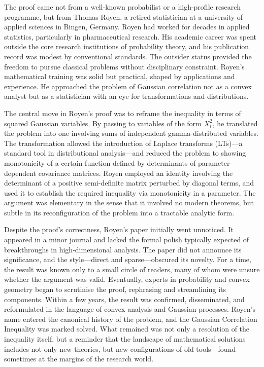 The proof came not from a well-known probabilist or a high-profile research programme, but from Thomas Royen, a retired statistician at a university of applied sciences in Bingen, Germany. Royen had worked for decades in applied statistics, particularly in pharmaceutical research. His academic career was spent outside the core research institutions of probability theory, and his publication record was modest by conventional standards. The outsider status provided the freedom to pursue classical problems without disciplinary constraint. Royen's mathematical training was solid but practical, shaped by applications and experience. He approached the problem of Gaussian correlation not as a convex analyst but as a statistician with an eye for transformations and distributions.

The central move in Royen's proof was to reframe the inequality in terms of squared Gaussian variables. By passing to variables of the form \( X_i^2 \), he translated the problem into one involving sums of independent gamma-distributed variables. The transformation allowed the introduction of Laplace transforms (LTs)—a standard tool in distributional analysis—and reduced the problem to showing monotonicity of a certain function defined by determinants of parameter-dependent covariance matrices. Royen employed an identity involving the determinant of a positive semi-definite matrix perturbed by diagonal terms, and used it to establish the required inequality via monotonicity in a parameter. The argument was elementary in the sense that it involved no modern theorems, but subtle in its reconfiguration of the problem into a tractable analytic form.

Despite the proof’s correctness, Royen’s paper initially went unnoticed. It appeared in a minor journal and lacked the formal polish typically expected of breakthroughs in high-dimensional analysis. The paper did not announce its significance, and the style—direct and sparse—obscured its novelty. For a time, the result was known only to a small circle of readers, many of whom were unsure whether the argument was valid. Eventually, experts in probability and convex geometry began to scrutinise the proof, rephrasing and streamlining its components. Within a few years, the result was confirmed, disseminated, and reformulated in the language of convex analysis and Gaussian processes. Royen’s name entered the canonical history of the problem, and the Gaussian Correlation Inequality was marked solved. What remained was not only a resolution of the inequality itself, but a reminder that the landscape of mathematical solutions includes not only new theories, but new configurations of old tools—found sometimes at the margins of the research world.
\newpage

